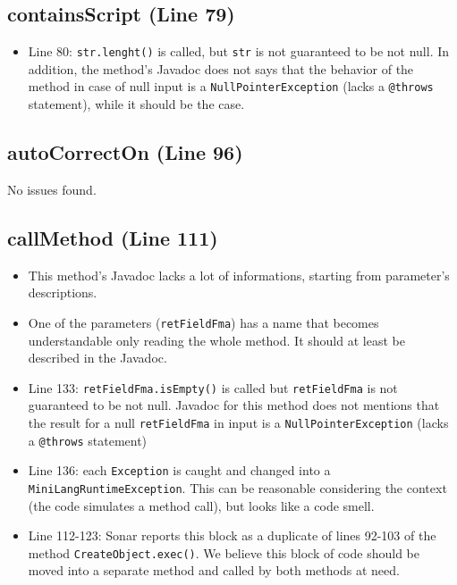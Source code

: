 \documentclass[11pt]{article} %
\begin{document}
\subsection{containsScript (Line 79)}
\begin{itemize}
	\item Line 80: \texttt{str.lenght()} is called, but \texttt{str} is not guaranteed to be not null. In addition, the method's Javadoc does not says that the behavior of the method in case of null input is a \texttt{NullPointerException} (lacks a \texttt{@throws} statement), while it should be the case.
\end{itemize}

\subsection{autoCorrectOn (Line 96)}
No issues found.

\subsection{callMethod (Line 111)}
\begin{itemize}
	\item This method's Javadoc lacks a lot of informations, starting from parameter's descriptions.
	\item One of the parameters (\texttt{retFieldFma}) has a name that becomes understandable only reading the whole method. It should at least be described in the Javadoc.
	\item Line 133: \texttt{retFieldFma.isEmpty()} is called but \texttt{retFieldFma} is not guaranteed to be not null. Javadoc for this method does not mentions that the result for a null \texttt{retFieldFma} in input is a \texttt{NullPointerException} (lacks a \texttt{@throws} statement)
	\item Line 136: each \texttt{Exception} is caught and changed into a \texttt{MiniLangRuntimeException}. This can be reasonable considering the context (the code simulates a method call), but looks like a code smell.
	\item Line 112-123: Sonar reports this block as a duplicate of lines 92-103 of the method \texttt{CreateObject.exec()}. We believe this block of code should be moved into a separate method and called by both methods at need.
\end{itemize}
\end{document}
